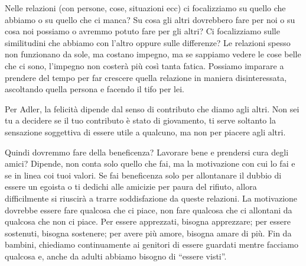 \documentclass[12pt]{book} %
\begin{document}
Nelle relazioni (con persone, cose, situazioni ecc) ci focalizziamo su quello che abbiamo o su quello che ci manca? Su cosa gli altri
dovrebbero fare per noi o su cosa noi possiamo o avremmo potuto fare per gli altri?
Ci focalizziamo sulle similitudini che abbiamo con l'altro oppure sulle differenze? Le relazioni spesso non funzionano
da sole, ma costano impegno, ma se sappiamo vedere le cose belle che ci sono,
l'impegno non costerà più così tanta fatica. Possiamo imparare a prendere del tempo per far crescere
quella relazione in maniera disinteressata, ascoltando quella persona e facendo il tifo per lei.

Per Adler, la felicità dipende dal senso di contributo che diamo agli altri. Non sei tu a decidere se il tuo contributo
è stato di giovamento, ti serve soltanto la sensazione soggettiva di essere utile a qualcuno, ma non per piacere agli
altri.

Quindi dovremmo fare della beneficenza? Lavorare bene e prendersi cura degli amici? Dipende, non conta solo quello che
fai, ma la motivazione con cui lo fai e se in linea coi tuoi valori. Se fai beneficenza solo per allontanare il
dubbio di essere un egoista o ti dedichi alle amicizie per paura del rifiuto, allora difficilmente si riuscirà a trarre
soddisfazione da queste relazioni. La motivazione dovrebbe essere fare qualcosa che ci piace, non fare qualcosa che ci
allontani da qualcosa che non ci piace. Per essere apprezzati, bisogna apprezzare; per essere sostenuti, bisogna
sostenere; per avere più amore, bisogna amare di più. Fin da bambini, chiediamo continuamente ai genitori di essere
guardati mentre facciamo qualcosa e, anche da adulti abbiamo bisogno di “essere visti”. 
\end{document}
